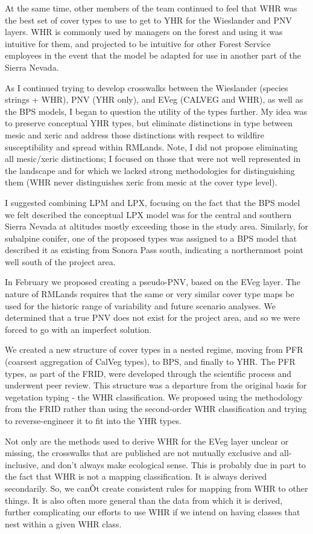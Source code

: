 At the same time, other members of the team continued to feel that WHR was the best set of cover types to use to get to YHR for the Wieslander and PNV layers. WHR is commonly used by managers on the forest and using it was intuitive for them, and projected to be intuitive for other Forest Service employees in the event that the model be adapted for use in another part of the Sierra Nevada.

As I continued trying to develop crosswalks between the Wieslander (species strings + WHR), PNV (YHR only), and EVeg (CALVEG and WHR), as well as the BPS models, I began to question the utility of the types further. My idea was to preserve conceptual YHR types, but eliminate distinctions in type between mesic and xeric and address those distinctions with respect to wildfire susceptibility and spread within RMLands. Note, I did not propose eliminating all mesic/xeric distinctions; I focused on those that were not well represented in the landscape and for which we lacked strong methodologies for distinguishing them (WHR never distinguishes xeric from mesic at the cover type level). 

I suggested combining LPM and LPX, focusing on the fact that the BPS model we felt described the conceptual LPX model was for the central and southern Sierra Nevada at altitudes mostly exceeding those in the study area. Similarly, for subalpine conifer, one of the proposed types was assigned to a BPS model that described it as existing from Sonora Pass south, indicating a northernmost point well south of the project area. 

In February we proposed creating a pseudo-PNV, based on the EVeg layer. The nature of RMLands requires that the same or very similar cover type maps be used for the historic range of variability and future scenario analyses. We determined that a true PNV does not exist for the project area, and so we were forced to go with an imperfect solution.

We created a new structure of cover types in a nested regime, moving from PFR (coarsest aggregation of CalVeg types), to BPS, and finally to YHR. The PFR types, as part of the FRID, were developed through the scientific process and underwent peer review. This structure was a departure from the original basis for vegetation typing - the WHR classification. We proposed using the methodology from the FRID rather than using the second-order WHR classification and trying to reverse-engineer it to fit into the YHR types.

Not only are the methods used to derive WHR for the EVeg layer unclear or missing, the crosswalks that are published are not mutually exclusive and all-inclusive, and don't always make ecological sense. This is probably due in part to the fact that WHR is not a mapping classification. It is always derived secondarily. So, we canÕt create consistent rules for mapping from WHR to other things. It is also often more general than the data from which it is derived, further complicating our efforts to use WHR if we intend on having classes that nest within a given WHR class.

